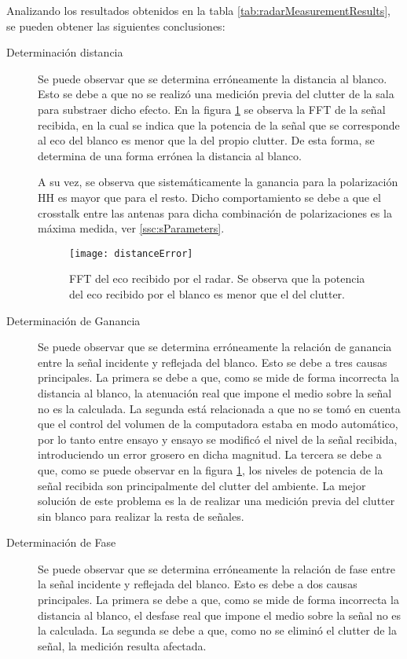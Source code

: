 Analizando los resultados obtenidos en la tabla \ref{tab:radarMeasurementResults}, se pueden obtener las siguientes conclusiones:
\begin{description}
  \item[Determinación distancia] Se puede observar que se determina erróneamente la distancia al blanco. Esto se debe a que no se realizó una medición previa del clutter de la sala para substraer dicho efecto. En la figura \ref{fig:distanceError} se observa la FFT de la señal recibida, en la cual se indica que la potencia de la señal que se corresponde al eco del blanco es menor que la del propio clutter. De esta forma, se determina de una forma errónea la distancia al blanco.

  A su vez, se observa que sistemáticamente la ganancia para la polarización HH es mayor que para el resto. Dicho comportamiento se debe a que el crosstalk entre las antenas para dicha combinación de polarizaciones es la máxima medida, ver \ref{ssc:sParameters}.

  \begin{figure}[htb]
    \centering
    \texttt{[image: distanceError]}
    \caption{FFT del eco recibido por el radar. Se observa que la potencia del eco recibido por el blanco es menor que el del clutter.}
    \label{fig:distanceError}
  \end{figure}

  \item[Determinación de Ganancia] Se puede observar que se determina erróneamente la relación de ganancia entre la señal incidente y reflejada del blanco. Esto se debe a tres causas principales. La primera se debe a que, como se mide de forma incorrecta la distancia al blanco, la atenuación real que impone el medio sobre la señal no es la calculada. La segunda está relacionada a que no se tomó en cuenta que el control del volumen de la computadora estaba en modo automático, por lo tanto entre ensayo y ensayo se modificó el nivel de la señal recibida, introduciendo un error grosero en dicha magnitud. La tercera se debe a que, como se puede observar en la figura \ref{fig:distanceError}, los niveles de potencia de la señal recibida son principalmente del clutter del ambiente. La mejor solución de este problema es la de realizar una medición previa del clutter sin blanco para realizar la resta de señales.

  \item[Determinación de Fase] Se puede observar que se determina erróneamente la relación de fase entre la señal incidente y reflejada del blanco. Esto es debe a dos causas principales. La primera se debe a que, como se mide de forma incorrecta la distancia al blanco, el desfase real que impone el medio sobre la señal no es la calculada. La segunda se debe a que, como no se eliminó el clutter de la señal, la medición resulta afectada.
\end{description}


